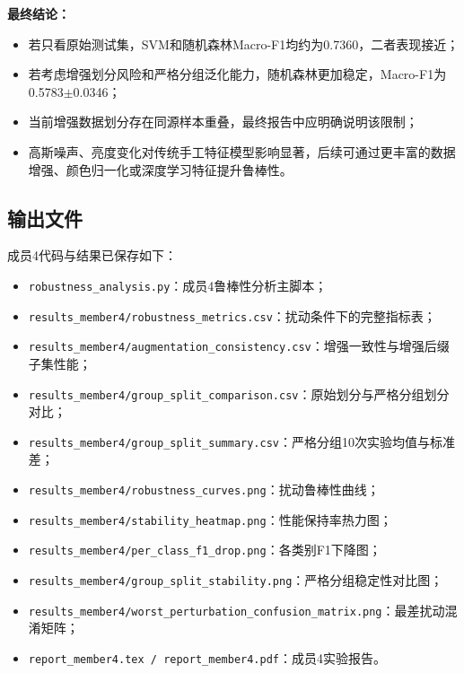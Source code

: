\documentclass[12pt,a4paper]{ctexart}
\begin{document}
\textbf{最终结论：}
\begin{itemize}
    \item 若只看原始测试集，SVM和随机森林Macro-F1均约为0.7360，二者表现接近；
    \item 若考虑增强划分风险和严格分组泛化能力，随机森林更加稳定，Macro-F1为0.5783$\pm$0.0346；
    \item 当前增强数据划分存在同源样本重叠，最终报告中应明确说明该限制；
    \item 高斯噪声、亮度变化对传统手工特征模型影响显著，后续可通过更丰富的数据增强、颜色归一化或深度学习特征提升鲁棒性。
\end{itemize}

\subsection{输出文件}

成员4代码与结果已保存如下：
\begin{itemize}
    \item \texttt{robustness\_analysis.py}：成员4鲁棒性分析主脚本；
    \item \texttt{results\_member4/robustness\_metrics.csv}：扰动条件下的完整指标表；
    \item \texttt{results\_member4/augmentation\_consistency.csv}：增强一致性与增强后缀子集性能；
    \item \texttt{results\_member4/group\_split\_comparison.csv}：原始划分与严格分组划分对比；
    \item \texttt{results\_member4/group\_split\_summary.csv}：严格分组10次实验均值与标准差；
    \item \texttt{results\_member4/robustness\_curves.png}：扰动鲁棒性曲线；
    \item \texttt{results\_member4/stability\_heatmap.png}：性能保持率热力图；
    \item \texttt{results\_member4/per\_class\_f1\_drop.png}：各类别F1下降图；
    \item \texttt{results\_member4/group\_split\_stability.png}：严格分组稳定性对比图；
    \item \texttt{results\_member4/worst\_perturbation\_confusion\_matrix.png}：最差扰动混淆矩阵；
    \item \texttt{report\_member4.tex / report\_member4.pdf}：成员4实验报告。
\end{itemize}
\end{document}
